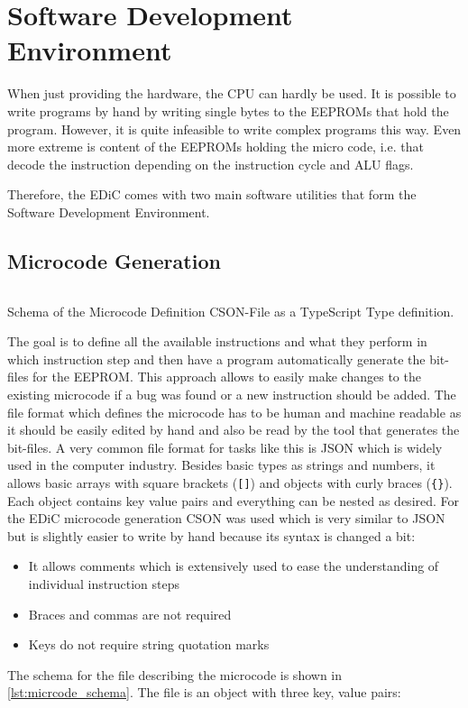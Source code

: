\chapter{Software Development Environment}\label{cha:software}
When just providing the hardware, the \gls{CPU} can hardly be used.
It is possible to write programs by hand by writing single bytes to the \glspl{EEPROM} that hold the program.
However, it is quite infeasible to write complex programs this way.
Even more extreme is content of the \glspl{EEPROM} holding the micro code, i.e. that decode the instruction depending on the instruction cycle and \gls{ALU} flags.

Therefore, the \gls{EDiC} comes with two main software utilities that form the Software Development Environment.

\section{Microcode Generation}\label{sec:microcode}
\begin{listing}[t]
  \inputminted[linenos,
    breaklines,
    frame=leftline,
    xleftmargin=20pt,
  ]{TypeScript}{src/microcode.ts}
  \caption{Schema of the Microcode Definition CSON-File \cite{CSON} as a TypeScript \cite{TS} Type definition.}
  \label{lst:micrcode_schema}
\end{listing}
The goal is to define all the available instructions and what they perform in which instruction step and then have a program automatically generate the bit-files for the \gls{EEPROM}.
This approach allows to easily make changes to the existing microcode if a bug was found or a new instruction should be added.
The file format which defines the microcode has to be human and machine readable as it should be easily edited by hand and also be read by the tool that generates the bit-files.
A very common file format for tasks like this is \gls{JSON} \cite{JSON} which is widely used in the computer industry.
Besides basic types as strings and numbers, it allows basic arrays with square brackets (\texttt{[]}) and objects with curly braces (\texttt{\{\}}).
Each object contains key value pairs and everything can be nested as desired.
For the \gls{EDiC} microcode generation \gls{CSON} was used which is very similar to \gls{JSON} but is slightly easier to write by hand because its syntax is changed a bit:
\begin{itemize}
  \item It allows comments which is extensively used to ease the understanding of individual instruction steps
  \item Braces and commas are not required
  \item Keys do not require string quotation marks
\end{itemize}
The schema for the file describing the microcode is shown in \cref{lst:micrcode_schema}.
The file is an object with three key, value pairs:
